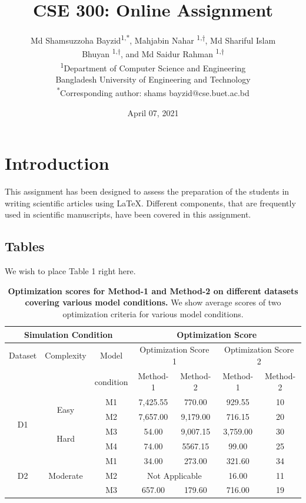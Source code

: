 \documentclass[11pt]{article}
\title{CSE 300: Online Assignment}
\author{Md Shamsuzzoha Bayzid\textsuperscript{1,*}, Mahjabin Nahar \textsuperscript{1,†}, Md Shariful Islam \\  Bhuyan \textsuperscript{1,†}, and Md Saidur Rahman \textsuperscript{1,†}
\\
\textsuperscript{1}Department of Computer Science and Engineering \\ Bangladesh University of Engineering and Technology 
\\
\textsuperscript{*}Corresponding author: shams bayzid@cse.buet.ac.bd}
\date{April 07, 2021}
\begin{document}
\maketitle
\section{Introduction}
This assignment has been designed to assess the preparation of the students in writing scientific articles using \LaTeX. Different components, that are frequently used in scientific manuscripts, have been covered in this assignment.
\subsection{Tables}
We wish to place Table 1 right here.
\begin{table}[H]
    \centering
    \caption{ \textbf{Optimization scores for Method-1 and Method-2 on different datasets covering various model conditions.} We show average scores of two optimization criteria for various model conditions.}
    \vspace{1cm}
    \begin{tabular}{|c|c c|c c|c c|}
       \hline
       \multicolumn{3}{|c|}{Simulation Condition} & \multicolumn{4}{|c|}{Optimization Score}\\
       \hline
       Dataset & Complexity & Model & \multicolumn{2}{|c|}{Optimization Score 1} & \multicolumn{2}{|c|}{Optimization Score 2} \\
      \cline{4-7}
       & & condition & Method-1 & Method-2 & Method-1 & Method-2\\
      \hline
      \hline
        \multirow{4}{*}{D1} & \multirow{2}{*}{Easy} & M1 & 7,425.55  & 770.00 & 929.55 & 10\\
     & & M2 & 7,657.00 & 9,179.00 & 716.15 & 20\\
     \cline{2-7}
     & \multirow{2}{*}{Hard} & M3 & 54.00 & 9,007.15 & 3,759.00 & 30 \\
     & & M4 & 74.00 & 5567.15 & 99.00 & 25 \\
      \hline
      \hline
     \multirow{3}{*}{D2} & \multirow{3}{*}{Moderate} & M1 & 34.00 & 273.00 & 321.60 & 34\\
     & & M2 & \multicolumn{2}{|c|}{Not Applicable} & 16.00 & 11\\
     & & M3 &  657.00 & 179.60 & 716.00 & 19\\
      \hline
    \end{tabular}
\end{table}
\pagebreak
\end{document}
